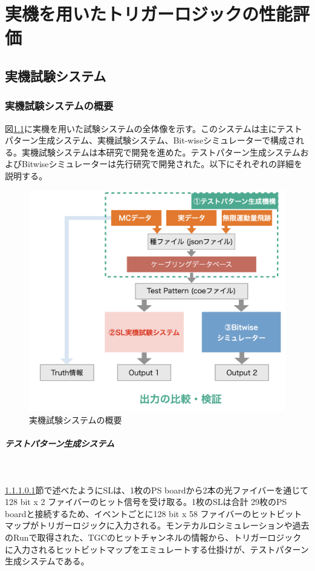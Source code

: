 \chapter{実機を用いたトリガーロジックの性能評価}
\label{chap_TriggerTest}

\section{実機試験システム}

\subsection{実機試験システムの概要}
\label{subsec_TestSystemOverview}
図\ref{Test_system}に実機を用いた試験システムの全体像を示す。このシステムは主にテストパターン生成システム、実機試験システム、Bit-wiseシミュレーターで構成される。実機試験システムは本研究で開発を進めた。テストパターン生成システムおよびBitwiseシミュレーターは先行研究で開発された。以下にそれぞれの詳細を説明する。

\begin{figure} 
\centering
\includegraphics[width=16cm]{fig/Test/Test_system.png}
\caption[実機試験システムの概要]{実機試験システムの概要}
\label{Test_system}
\end{figure}

\paragraph{テストパターン生成システム}　　
\par
\ref{}節で述べたようにSLは、1枚のPS boardから2本の光ファイバーを通じて128 bit x 2 ファイバーのヒット信号を受け取る。1枚のSLは合計 29枚のPS boardと接続するため、イベントごとに128 bit x 58 ファイバーのヒットビットマップがトリガーロジックに入力される。モンテカルロシミュレーションや過去のRunで取得された、TGCのヒットチャンネルの情報から、トリガーロジックに入力されるヒットビットマップをエミュレートする仕掛けが、テストパターン生成システムである。


